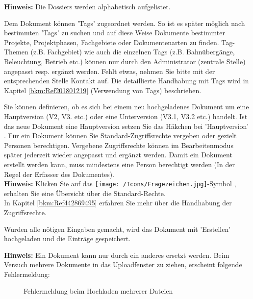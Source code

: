 \textbf{Hinweis:} Die Dossiers werden alphabetisch aufgelistet.

\vspace{\baselineskip}

Dem Dokument können 'Tags'  zugeordnet werden. So ist es später möglich nach bestimmten 'Tags' zu suchen und auf diese Weise Dokumente bestimmter Projekte, Projektphasen, Fachgebiete oder Dokumentenarten zu finden. Tag-Themen (z.B. Fachgebiet) wie auch die einzelnen Tags (z.B. Bahnübergänge, Beleuchtung, Betrieb etc.) können nur durch den Administrator (zentrale Stelle) angepasst resp. ergänzt werden. Fehlt etwas, nehmen Sie bitte mit der entsprechenden Stelle Kontakt auf. Die detaillierte Handhabung mit Tags wird in Kapitel \ref{bkm:Ref201801219} (Verwendung von Tags) beschrieben. \newline

Sie können definieren, ob es sich bei einem neu hochgeladenes Dokument um eine Hauptversion (V2, V3. etc.) oder eine Unterversion (V3.1, V3.2 etc.) handelt. Ist das neue Dokument eine Hauptversion setzen Sie das Häkchen bei 'Hauptversion' . Für ein Dokument können Sie Standard-Zugriffsrechte vergeben  oder gezielt Personen berechtigen. Vergebene Zugriffsrechte können im Bearbeitenmodus später jederzeit wieder angepasst und ergänzt werden. Damit ein Dokument erstellt werden kann, muss mindestens eine Person berechtigt werden (In der Regel der Erfasser des Dokumentes).\\
\textbf{Hinweis:} Klicken Sie auf das \texttt{[image: /Icons/Fragezeichen.jpg]}-Symbol , erhalten Sie eine Übersicht über die Standard-Rechte.\\
In Kapitel \ref{bkm:Ref442869495} erfahren Sie mehr über die Handhabung der Zugriffsrechte.

\vspace{\baselineskip}

Wurden alle nötigen Eingaben gemacht, wird das Dokument mit 'Erstellen'  hochgeladen und die Einträge gespeichert. \newline

\textbf{Hinweis:} Ein Dokument kann nur durch ein anderes ersetzt werden. Beim Versuch mehrere Dokumente in das Uploadfenster zu ziehen, erscheint folgende Fehlermeldung:

\begin{figure}[H]
\caption{Fehlermeldung beim Hochladen mehrerer Dateien}
\end{figure}

